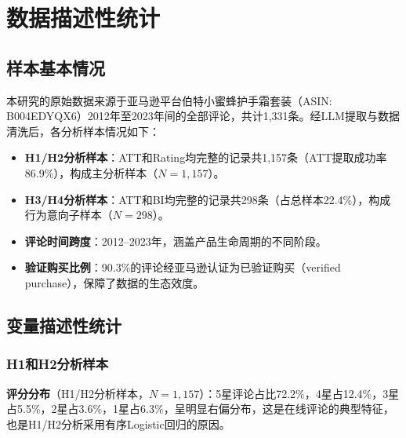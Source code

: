 \section{数据描述性统计}

\subsection{样本基本情况}

本研究的原始数据来源于亚马逊平台伯特小蜜蜂护手霜套装（ASIN: B004EDYQX6）2012年至2023年间的全部评论，共计1{,}331条。经LLM提取与数据清洗后，各分析样本情况如下：

\begin{itemize}
  \item \textbf{H1/H2分析样本}：ATT和Rating均完整的记录共1{,}157条（ATT提取成功率86.9\%），构成主分析样本（$N=1{,}157$）。
  \item \textbf{H3/H4分析样本}：ATT和BI均完整的记录共298条（占总样本22.4\%），构成行为意向子样本（$N=298$）。
  \item \textbf{评论时间跨度}：2012--2023年，涵盖产品生命周期的不同阶段。
  \item \textbf{验证购买比例}：90.3\%的评论经亚马逊认证为已验证购买（verified purchase），保障了数据的生态效度。
\end{itemize}

\subsection{变量描述性统计}

\subsubsection{H1和H2分析样本}

\textbf{评分分布}（H1/H2分析样本，$N=1{,}157$）：5星评论占比72.2\%，4星占12.4\%，3星占5.5\%，2星占3.6\%，1星占6.3\%，呈明显右偏分布，这是在线评论的典型特征，也是H1/H2分析采用有序Logistic回归的原因。

